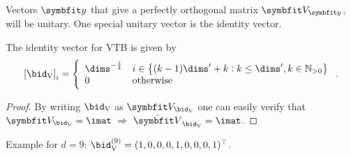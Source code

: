 Vectors $\vc y$ that give a perfectly orthogonal matrix $\mat V_{\vc y}$, will be unitary.
One special unitary vector is the identity vector.
\begin{corollary}
    The identity vector for VTB is given by
    \begin{equation}
        \sbr{\bid_{\ped{V}}}_i = \left\{ \begin{array}{ll}
                \dims^{-\frac{1}{4}} & i \in \cbr{(k - 1) \dims' + k : k \leq \dims', k \in \mathbb{N}_{>0}} \\
                0 & \text{otherwise}
        \end{array}\right. \text{.}
    \end{equation}
    \begin{proof}
        By writing $\bid_{\ped{V}}$ as $\mat V_{\bid_{\ped{V}}}$ one can easily verify that $\mat V_{\bid_{\ped{V}}} = \imat\ \Rightarrow\ \bar{\mat V}_{\bid_{\ped{V}}} = \imat$.
    \end{proof}
\end{corollary}
Example for $d = 9$: $\bid_{\ped{V}}^{(9)} = (1, 0, 0, 0, 1, 0, 0, 0, 1)\Tr$.

